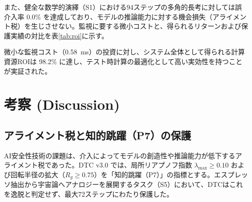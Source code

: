 \documentclass[11pt,a4paper]{article}
\begin{document}
また、健全な数学的演繹（S1）における94ステップの多角的長考に対しては誤介入率 0.0\% を達成しており、モデルの推論能力に対する機会損失（アライメント税）を生じさせない。監視に要する微小コストと、得られるリターンおよび保護実績の対比を表\ref{tab:roi}に示す。

\begin{table}[htbp]
\centering
\caption{DTC v3.0 計算オーバーヘッド対トークン削減ROIの費用便益分析}
\label{tab:roi}
\small
{}
\end{table}

微小な監視コスト（0.58~ms）の投資に対し、システム全体として得られる計算資源ROIは 98.2\% に達し、テスト時計算の最適化として高い実効性を持つことが実証された。

\section{考察 (Discussion)}

\subsection{アライメント税と知的跳躍（P7）の保護}

AI安全性技術の課題は、介入によってモデルの創造性や推論能力が低下するアライメント税であった。DTC v3.0 では、局所リアプノフ指数 $\lambda_{\max} \ge 0.10$ および回転半径の拡大（$R_g \ge 0.75$）を「知的跳躍（P7）」の指標とする。エスプレッソ抽出から宇宙論へアナロジーを展開するタスク（S5）において、DTCはこれを逸脱と判定せず、最大72ステップにわたり保護した。
\end{document}
